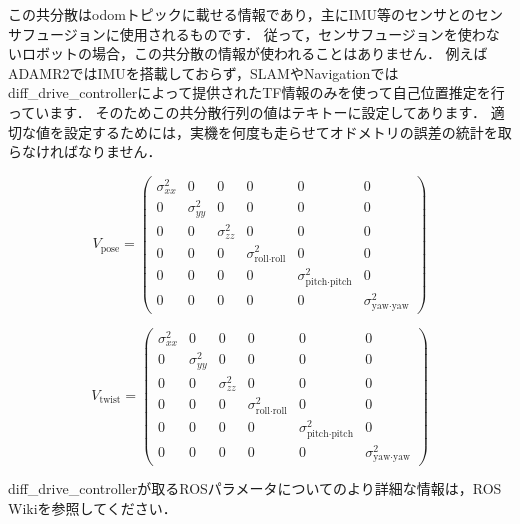 \documentclass[{../../master}]{subfiles}
\begin{document}
この共分散は\textsf{odom}トピックに載せる情報であり，主にIMU等のセンサとのセンサフュージョンに使用されるものです．
従って，センサフュージョンを使わないロボットの場合，この共分散の情報が使われることはありません．
例えばADAMR2ではIMUを搭載しておらず，SLAMやNavigationでは\textsf{diff\_drive\_controller}によって提供されたTF情報のみを使って自己位置推定を行っています．
そのためこの共分散行列の値はテキトーに設定してあります．
適切な値を設定するためには，実機を何度も走らせてオドメトリの誤差の統計を取らなければなりません．

\begin{equation}
  V_{\text{pose}} =
  \begin{pmatrix}
    \sigma_{xx}^2 & 0 & 0 & 0 & 0 & 0 \\
    0 & \sigma_{yy}^2 & 0 & 0 & 0 & 0 \\
    0 & 0 & \sigma_{zz}^2 & 0 & 0 & 0 \\
    0 & 0 & 0 & \sigma_{\text{roll}\cdot\text{roll}}^2 & 0 & 0 \\
    0 & 0 & 0 & 0 & \sigma_{\text{pitch}\cdot\text{pitch}}^2 & 0 \\
    0 & 0 & 0 & 0 & 0 & \sigma_{\text{yaw}\cdot\text{yaw}}^2 
  \end{pmatrix}
  \label{eq:pose_covariance_matrix}
\end{equation}

\begin{equation}
  V_{\text{twist}} =
  \begin{pmatrix}
    \sigma_{xx}^2 & 0 & 0 & 0 & 0 & 0 \\
    0 & \sigma_{yy}^2 & 0 & 0 & 0 & 0 \\
    0 & 0 & \sigma_{zz}^2 & 0 & 0 & 0 \\
    0 & 0 & 0 & \sigma_{\text{roll}\cdot\text{roll}}^2 & 0 & 0 \\
    0 & 0 & 0 & 0 & \sigma_{\text{pitch}\cdot\text{pitch}}^2 & 0 \\
    0 & 0 & 0 & 0 & 0 & \sigma_{\text{yaw}\cdot\text{yaw}}^2 
  \end{pmatrix}
  \label{eq:twist_covariance_matrix}
\end{equation}

\textsf{diff\_drive\_controller}が取るROSパラメータについてのより詳細な情報は，ROS Wikiを参照してください．
\end{document}

